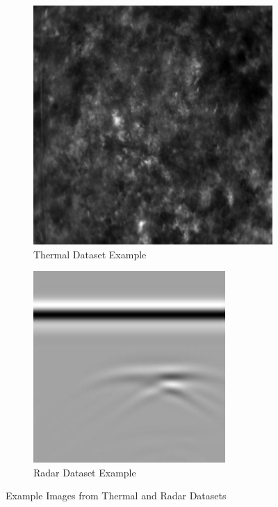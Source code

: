 \begin{figure}[htbp]
  \centering
  \begin{subfigure}[t]{0.48\textwidth}
    \centering
    \includegraphics[width=\textwidth]{figs/Rory/A_thermal_image.jpg} %
    \caption{Thermal Dataset Example}
    \label{fig:thermal_example}
  \end{subfigure}
  \hfill
  \begin{subfigure}[t]{0.48\textwidth}
    \centering
    \includegraphics[width=\textwidth]{figs/Rory/A_radar_image.jpg} %
    \caption{Radar Dataset Example}
    \label{fig:radar_example}
  \end{subfigure}
  \caption{Example Images from Thermal and Radar Datasets}
  \label{fig:dataset_examples}
\end{figure}

